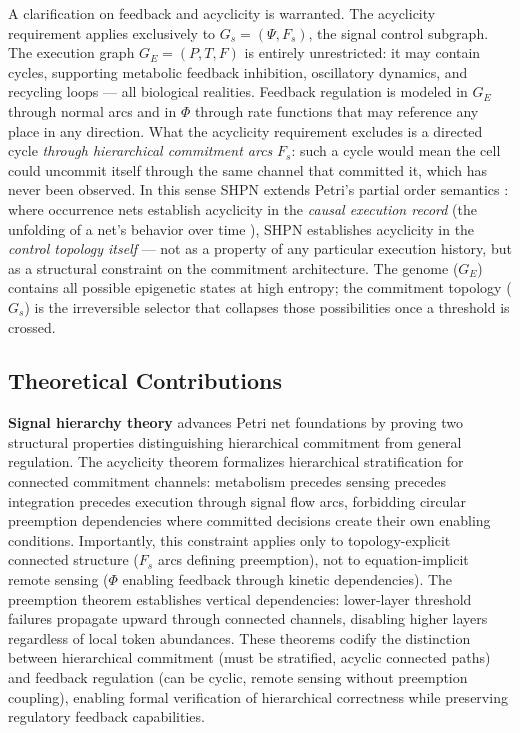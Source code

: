\documentclass[10pt,letterpaper]{article}
\begin{document}
A clarification on feedback and acyclicity is warranted. The acyclicity
requirement applies exclusively to $G_s = (\Psi, F_s)$, the signal control
subgraph. The execution graph $G_E = (P, T, F)$ is entirely unrestricted: it
may contain cycles, supporting metabolic feedback inhibition, oscillatory
dynamics, and recycling loops --- all biological realities. Feedback regulation
is modeled in $G_E$ through normal arcs and in $\Phi$ through rate functions
that may reference any place in any direction. What the acyclicity requirement
excludes is a directed cycle \textit{through hierarchical commitment arcs}
$F_s$: such a cycle would mean the cell could uncommit itself through the
same channel that committed it, which has never been observed. In this sense
SHPN extends Petri's partial order semantics \cite{nielsen1981}: where
occurrence nets establish acyclicity in the \textit{causal execution record}
(the unfolding of a net's behavior over time \cite{winskel1987}), SHPN
establishes acyclicity in the \textit{control topology itself} --- not as a
property of any particular execution history, but as a structural constraint
on the commitment architecture. The genome ($G_E$) contains all possible
epigenetic states at high entropy; the commitment topology ($G_s$) is the
irreversible selector that collapses those possibilities once a threshold is
crossed.

\subsection{Theoretical Contributions}

\textbf{Signal hierarchy theory} advances Petri net foundations by proving two structural properties distinguishing hierarchical commitment from general regulation. The acyclicity theorem formalizes hierarchical stratification for connected commitment channels: metabolism precedes sensing precedes integration precedes execution through signal flow arcs, forbidding circular preemption dependencies where committed decisions create their own enabling conditions. Importantly, this constraint applies only to topology-explicit connected structure ($F_s$ arcs defining preemption), not to equation-implicit remote sensing ($\Phi$ enabling feedback through kinetic dependencies). The preemption theorem establishes vertical dependencies: lower-layer threshold failures propagate upward through connected channels, disabling higher layers regardless of local token abundances. These theorems codify the distinction between hierarchical commitment (must be stratified, acyclic connected paths) and feedback regulation (can be cyclic, remote sensing without preemption coupling), enabling formal verification of hierarchical correctness while preserving regulatory feedback capabilities.
\end{document}
